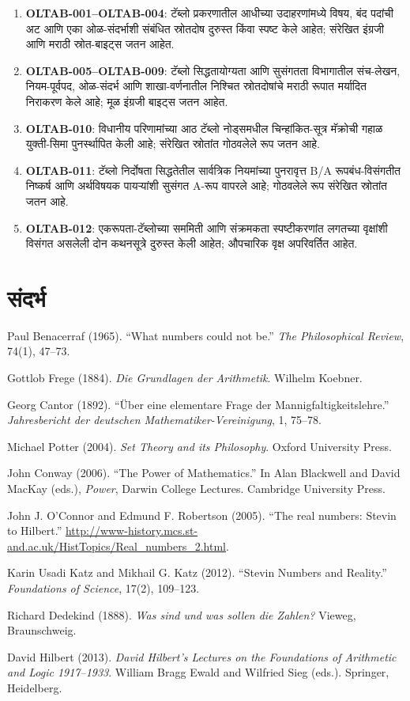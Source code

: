 \documentclass[11pt,a4paper,openany]{book}
\theoremstyle{definition}
\begin{document}
\begin{enumerate}
\item \textbf{OLTAB-001--OLTAB-004}: टॅब्लो प्रकरणातील आधीच्या
उदाहरणांमध्ये विषय, बंद पदांची अट आणि एका ओळ-संदर्भाशी संबंधित स्रोतदोष
दुरुस्त किंवा स्पष्ट केले आहेत; संरेखित इंग्रजी आणि मराठी स्रोत-बाइट्स जतन आहेत.
\item \textbf{OLTAB-005--OLTAB-009}: टॅब्लो सिद्धतायोग्यता आणि सुसंगतता
विभागातील संच-लेखन, नियम-पूर्वपद, ओळ-संदर्भ आणि शाखा-वर्णनातील निश्चित
स्रोतदोषांचे मराठी रूपात मर्यादित निराकरण केले आहे; मूळ इंग्रजी बाइट्स जतन आहेत.
\item \textbf{OLTAB-010}: विधानीय परिणामांच्या आठ टॅब्लो नोड्समधील
चिन्हांकित-सूत्र मॅक्रोची गहाळ युक्ती-सिमा पुनर्स्थापित केली आहे; संरेखित
स्रोतांत गोठवलेले रूप जतन आहे.
\item \textbf{OLTAB-011}: टॅब्लो निर्दोषता सिद्धतेतील सार्वत्रिक नियमांच्या
पुनरावृत्त B/A रूपबंध-विसंगतीत निष्कर्ष आणि अर्थविषयक पायऱ्यांशी सुसंगत
A-रूप वापरले आहे; गोठवलेले रूप संरेखित स्रोतांत जतन आहे.
\item \textbf{OLTAB-012}: एकरूपता-टॅब्लोच्या सममिती आणि संक्रमकता
स्पष्टीकरणांत लगतच्या वृक्षांशी विसंगत असलेली दोन कथनसूत्रे दुरुस्त केली आहेत;
औपचारिक वृक्ष अपरिवर्तित आहेत.
\end{enumerate}
\chapter*{संदर्भ}
\label{bib:Benacerraf1965}
Paul Benacerraf (1965). ``What numbers could not be.''
\textit{The Philosophical Review}, 74(1), 47--73.

\par\medskip
Gottlob Frege (1884). \textit{Die Grundlagen der Arithmetik}.
Wilhelm Koebner.

Georg Cantor (1892). ``Über eine elementare Frage der
Mannigfaltigkeitslehre.'' \textit{Jahresbericht der deutschen
Mathematiker-Vereinigung}, 1, 75--78.

Michael Potter (2004). \textit{Set Theory and its Philosophy}.
Oxford University Press.

John Conway (2006). ``The Power of Mathematics.'' In Alan Blackwell
and David MacKay (eds.), \textit{Power}, Darwin College Lectures.
Cambridge University Press.

John J. O'Connor and Edmund F. Robertson (2005). ``The real numbers:
Stevin to Hilbert.''
\url{http://www-history.mcs.st-and.ac.uk/HistTopics/Real_numbers_2.html}.

Karin Usadi Katz and Mikhail G. Katz (2012). ``Stevin Numbers and
Reality.'' \textit{Foundations of Science}, 17(2), 109--123.

Richard Dedekind (1888). \textit{Was sind und was sollen die Zahlen?}
Vieweg, Braunschweig.

David Hilbert (2013). \textit{David Hilbert's Lectures on the Foundations
of Arithmetic and Logic 1917--1933}. William Bragg Ewald and Wilfried Sieg
(eds.). Springer, Heidelberg.
\end{document}
